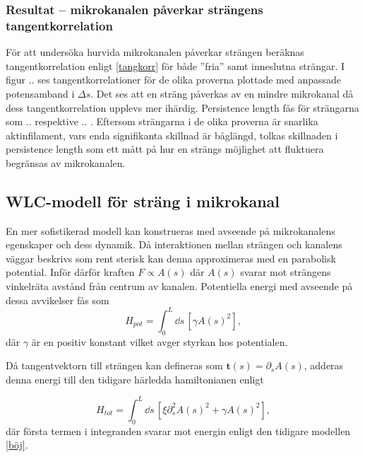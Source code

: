 \subsubsection{Resultat -- mikrokanalen påverkar strängens tangentkorrelation}



För att undersöka hurvida mikrokanalen påverkar strängen beräknas tangentkorrelation enligt \eqref{tangkorr} för både ''fria'' samt inneslutna strängar. I figur .. ses tangentkorrelationer för de olika proverna plottade med anpassade potensamband i $\Delta s$. Det ses att en sträng påverkas av en mindre mikrokanal då dess tangentkorrelation upplevs mer ihärdig. Persistence length fås för strängarna som .. respektive .. . Eftersom strängarna i de olika proverna är snarlika aktinfilament, vars enda signifikanta skillnad är båglängd, tolkas skillnaden i persistence length som ett mått på hur en strängs möjlighet att fluktuera begränsas av mikrokanalen. 



\subsection{WLC-modell för sträng i mikrokanal}
\label{WLCkanal}


En mer sofistikerad modell kan konstrueras med avseende på mikrokanalens egenskaper och dess dynamik. Då interaktionen mellan strängen och kanalens väggar beskrivs som rent sterisk \cite{Koster_etal2007} kan denna approximeras med en parabolisk potential. Inför därför kraften $F \propto A(s)$ där $A(s)$ svarar mot strängens vinkelräta avstånd från centrum av kanalen. Potentiella energi med avseende på dessa avvikelser fås som
\begin{equation}
    H_{pot}=\int_{0}^{L} \!\dd{s} \, [\gamma A(s)^2],
\end{equation}
där $\gamma$ är en positiv konstant vilket avger styrkan hos potentialen. 

Då tangentvektorn till strängen kan defineras som $\mathbf{t}(s)=\partial_sA(s)$, adderas denna energi till den tidigare härledda hamiltonianen enligt

\begin{equation}
\label{Htot}
    H_{tot}=\int_{0}^{L}\!\dd{s}\,[\xi\partial_{s}^{2}A(s)^2 + \gamma A(s)^2],
\end{equation}
där första termen i integranden svarar mot energin enligt den tidigare modellen \eqref{böj}.

